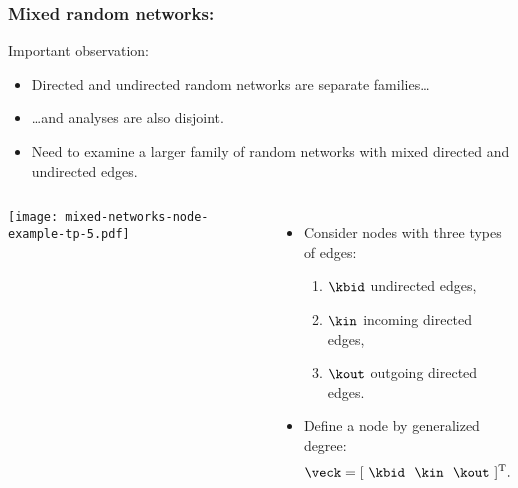 \begin{frame}
  \frametitle{Mixed random networks:}
  
  \begin{block}{Important observation:}
    \begin{itemize}
    \item<1->
      Directed and undirected random networks are separate families\ldots
    \item<2->
      \ldots and analyses are also disjoint.
    \item<3->
      Need to examine a larger family of random networks
      with mixed directed and undirected edges.
    \end{itemize}
  \end{block}

  \begin{overprint}
    \begin{columns}
      \texttt{[image: mixed-networks-node-example-tp-5.pdf]}
      \begin{itemize}
      \item<4->
        Consider nodes with three types of edges:
        \begin{enumerate}
        \item<4->
          $\kbid$ undirected edges,
        \item<4->
          $\kin$ incoming directed edges,
        \item<4->
          $\kout$ outgoing directed edges.
        \end{enumerate}
      \item<5->
        Define a node by generalized degree:
        $$
        \veck = [\ \kbid \ \  \kin \ \ \kout\ ]^{\textnormal{T}}.
        $$
      \end{itemize}
    \end{columns}
  \end{overprint}

\end{frame}

